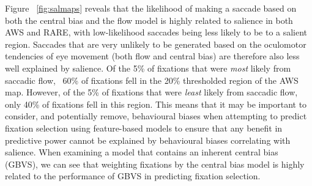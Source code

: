 Figure ~\ref{fig:salmaps} reveals that the likelihood of making a saccade based on both the central bias and the flow model is highly related to salience in both AWS and RARE, with low-likelihood saccades being less likely to be to a salient region. Saccades that are very unlikely to be generated based on the oculomotor tendencies of eye movement (both flow and central bias) are therefore also less well explained by salience. Of the 5\% of fixations that were \textit{most} likely from saccadic flow, ~60\% of fixations fell in the 20\% thresholded region of the AWS map. However, of the 5\% of fixations that were \textit{least} likely from saccadic flow, only 40\% of fixations fell in this region. This means that it may be important to consider, and potentially remove, behavioural biases when attempting to predict fixation selection using feature-based models to ensure that any benefit in predictive power cannot be explained by behavioural biases correlating with salience. When examining a model that contains an inherent central bias (GBVS), we can see that weighting fixations by the \citet{clarke-tatler2014} central bias model is highly related to the performance of GBVS in predicting fixation selection.


